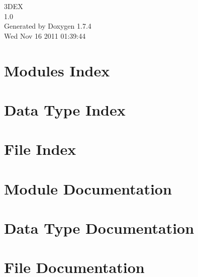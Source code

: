 \documentclass[a4paper]{book}
\begin{document}
\hypersetup{pageanchor=false}
\begin{titlepage}
\vspace*{7cm}
\begin{center}
{\Large 3DEX \\[1ex]\large 1.0 }\\
\vspace*{1cm}
{\large Generated by Doxygen 1.7.4}\\
\vspace*{0.5cm}
{\small Wed Nov 16 2011 01:39:44}\\
\end{center}
\end{titlepage}
\clearemptydoublepage
{}
\tableofcontents
\clearemptydoublepage
{}
\hypersetup{pageanchor=true}
\chapter{Modules Index}

\chapter{Data Type Index}

\chapter{File Index}

\chapter{Module Documentation}






\chapter{Data Type Documentation}

\chapter{File Documentation}
















\printindex
\end{document}
